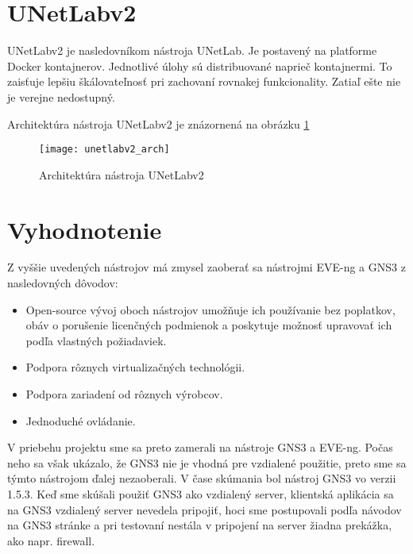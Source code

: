 \section{UNetLabv2}
\label{chap:unetlabv2}

UNetLabv2 je nasledovníkom nástroja UNetLab. Je postavený na platforme Docker kontajnerov. Jednotlivé úlohy sú distribuované naprieč kontajnermi. To zaisťuje lepšiu škálovateľnosť pri zachovaní rovnakej funkcionality. Zatiaľ ešte nie je verejne nedostupný. \cite{webiou_unetlab_unetlabv2}

Architektúra nástroja UNetLabv2 je znázornená na obrázku \ref{obr:unetlabv2_arch}

\begin{figure}
    \centering
    \texttt{[image: unetlabv2\_arch]}
    \caption{Architektúra nástroja UNetLabv2} \cite{obr_unetlabv2_arch}
    \label{obr:unetlabv2_arch}
\end{figure}





\section{Vyhodnotenie}

Z vyššie uvedených nástrojov má zmysel zaoberať sa nástrojmi EVE-ng a GNS3 z nasledovných dôvodov:
\begin{itemize}[noitemsep]
    \item Open-source vývoj oboch nástrojov umožňuje ich používanie bez poplatkov, obáv o porušenie licenčných podmienok a poskytuje možnosť upravovať ich podľa vlastných požiadaviek.
    \item Podpora rôznych virtualizačných technológii.
    \item Podpora zariadení od rôznych výrobcov.
    \item Jednoduché ovládanie.
\end{itemize}

V priebehu projektu sme sa preto zamerali na nástroje GNS3 a EVE-ng. Počas neho sa však ukázalo, že GNS3 nie je vhodná pre vzdialené použitie, preto sme sa týmto nástrojom ďalej nezaoberali. V čase skúmania bol nástroj GNS3 vo verzii 1.5.3. Keď sme skúšali použiť GNS3 ako vzdialený server, klientská aplikácia sa na GNS3 vzdialený server nevedela pripojiť, hoci sme postupovali podľa návodov na GNS3 stránke a pri testovaní nestála v pripojení na server žiadna prekážka, ako napr. firewall.

